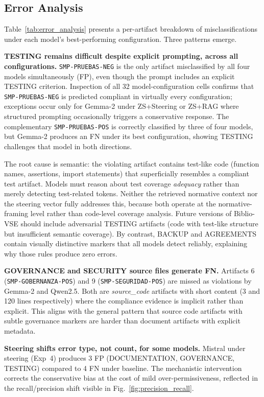 \documentclass{ieeeaccess}
\begin{document}
\subsection{Error Analysis}

Table~\ref{tab:error_analysis} presents a per-artifact breakdown of misclassifications under each model's best-performing configuration. Three patterns emerge.

\textbf{TESTING remains difficult despite explicit prompting, across all configurations.} \texttt{SMP-PRUEBAS-NEG} is the only artifact misclassified by all four models simultaneously (FP), even though the prompt includes an explicit TESTING criterion. Inspection of all 32 model-configuration cells confirms that \texttt{SMP-PRUEBAS-NEG} is predicted compliant in virtually every configuration; exceptions occur only for Gemma-2 under ZS+Steering or ZS+RAG where structured prompting occasionally triggers a conservative response. The complementary \texttt{SMP-PRUEBAS-POS} is correctly classified by three of four models, but Gemma-2 produces an FN under its best configuration, showing TESTING challenges that model in both directions.

The root cause is semantic: the violating artifact contains test-like code (function names, assertions, import statements) that superficially resembles a compliant test artifact. Models must reason about test coverage \emph{adequacy} rather than merely detecting test-related tokens. Neither the retrieved normative context nor the steering vector fully addresses this, because both operate at the normative-framing level rather than code-level coverage analysis. Future versions of Biblio-VSE should include adversarial TESTING artifacts (code with test-like structure but insufficient semantic coverage). By contrast, BACKUP and AGREEMENTS contain visually distinctive markers that all models detect reliably, explaining why those rules produce zero errors.

\textbf{GOVERNANCE and SECURITY source files generate FN.} Artifacts 6 (\texttt{SMP-GOBERNANZA-POS}) and 9 (\texttt{SMP-SEGURIDAD-POS}) are missed as violations by Gemma-2 and Qwen2.5. Both are \textit{source\_code} artifacts with short content (3 and 120 lines respectively) where the compliance evidence is implicit rather than explicit. This aligns with the general pattern that source code artifacts with subtle governance markers are harder than document artifacts with explicit metadata.

\textbf{Steering shifts error type, not count, for some models.} Mistral under steering (Exp~4) produces 3 FP (DOCUMENTATION, GOVERNANCE, TESTING) compared to 4 FN under baseline. The mechanistic intervention corrects the conservative bias at the cost of mild over-permissiveness, reflected in the recall/precision shift visible in Fig.~\ref{fig:precision_recall}.
\end{document}
